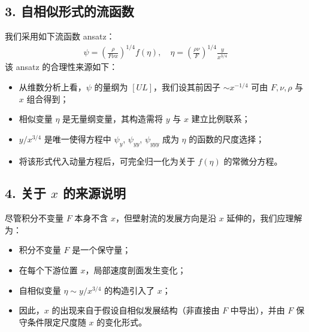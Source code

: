 \subsection*{3. 自相似形式的流函数}

我们采用如下流函数 ansatz：
\begin{align}
    \psi = \left( \frac{\rho}{F \nu x} \right)^{1/4} f(\eta), \quad \eta = \left( \frac{\rho \nu}{F} \right)^{1/4} \frac{y}{x^{3/4}}
\end{align}
该 ansatz 的合理性来源如下：

\begin{itemize}
    \item 从维数分析上看，$\psi$ 的量纲为 $[UL]$，我们设其前因子 $\sim x^{-1/4}$ 可由 $F,\nu,\rho$ 与 $x$ 组合得到；
    \item 相似变量 $\eta$ 是无量纲变量，其构造需将 $y$ 与 $x$ 建立比例联系；
    \item $y/x^{3/4}$ 是唯一使得方程中 $\psi_{y}$, $\psi_{yy}$, $\psi_{yyy}$ 成为 $\eta$ 的函数的尺度选择；
    \item 将该形式代入动量方程后，可完全归一化为关于 $f(\eta)$ 的常微分方程。
\end{itemize}

\subsection*{4. 关于 $x$ 的来源说明}

尽管积分不变量 $F$ 本身不含 $x$，但壁射流的发展方向是沿 $x$ 延伸的，我们应理解为：

\begin{itemize}
    \item 积分不变量 $F$ 是一个保守量；
    \item 在每个下游位置 $x$，局部速度剖面发生变化；
    \item 自相似变量 $\eta \sim y / x^{3/4}$ 的构造引入了 $x$；
    \item 因此，$x$ 的出现来自于假设自相似发展结构（非直接由 $F$ 中导出），并由 $F$ 保守条件限定尺度随 $x$ 的变化形式。
\end{itemize}


